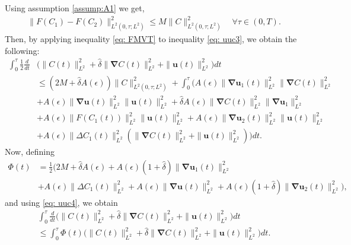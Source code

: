 \documentclass[final,3p,times]{elsarticle}
\theoremstyle{plain}
\theoremstyle{remark}
\theoremstyle{plain}
\theoremstyle{remark}
\begin{document}
Using assumption \eqref{assump:A1} we get,
\begin{align}
   \|F\left(C_1\right)-F\left(C_2\right)\|^2_{L^2\left(0,\tau;L^2\right)}\le M \|C\|^2_{L^2\left(0,\tau;L^2\right)} \quad \forall \tau \in \left(0,T\right). \label{eq: FMVT}
\end{align}
Then, by applying inequality \eqref{eq: FMVT} to inequality \eqref{eq: uuc3}, we obtain the following:
\begin{align}
\int_0^\tau \frac{1}{2} \frac{d}{dt} & \Big(\|C\left(t\right)\|^2_{L^2} + \hat \delta\|\boldsymbol{\nabla} C\left(t\right)\|^2_{L^2} +\|\mathbf u\left(t\right)\|_{L^2}^2 \Big) dt \nonumber \\ 
& \le  \left(2M+\hat \delta A\left(\epsilon\right) \right)\|C\|^2_{L^2\left(0,\tau;L^2\right)} + \int_0^\tau\Big(A\left(\epsilon\right) \|\boldsymbol{\nabla}\mathbf u_1\left(t\right)\|^2_{L^2} \|\boldsymbol{\nabla} C\left(t\right)\|^2_{L^2} \nonumber \\
& + A\left(\epsilon\right) \|\boldsymbol{\nabla}\mathbf u\left(t\right)\|^2_{L^2} \|\mathbf u\left(t\right)\|^2_{L^2} +\hat \delta  A\left(\epsilon\right) \|\boldsymbol{\nabla} C\left(t\right)\|^{2}_{L^2} \|\boldsymbol{\nabla} \mathbf u_1\|^{2}_{L^2} \nonumber \\
& + A\left(\epsilon\right)\|F\left(C_1\left(t\right)\right)\|^2_{L^2}\|\mathbf u\left(t\right)\|_{L^2}^2 + A\left(\epsilon\right)\|\boldsymbol{\nabla}\mathbf u_2\left(t\right)\|^2_{L^2}\|\mathbf u\left(t\right)\|^2_{L^2} \nonumber \\ 
& + A\left(\epsilon\right) \|\Delta C_1\left(t\right)\|_{L^2}^2 \left( \|\boldsymbol{\nabla} C\left(t\right)\|_{L^2}^2 + \|\mathbf{u}\left(t\right)\|_{L^2}^2 \right)\Big)dt. \label{eq: uuc4} 
\end{align}
Now, defining
\begin{align}
    \Phi\left(t\right) & = \frac{1}{2}\Big(2M+\hat \delta A\left(\epsilon\right)+A\left(\epsilon\right)\left(1+\hat \delta\right) \|\boldsymbol{\nabla}\mathbf u_1\left(t\right)\|^2_{L^2} \nonumber\\ 
    & + A\left(\epsilon\right) \|\Delta C_1\left(t\right)\|_{L^2}^2+A\left(\epsilon\right) \|\boldsymbol{\nabla}\mathbf u\left(t\right)\|^2_{L^2} + A\left(\epsilon\right)\left(1+\hat \delta\right) \|\boldsymbol{\nabla}\mathbf u_2\left(t\right)\|^2_{L^2}\Big),
\end{align}
and using \eqref{eq: uuc4}, we obtain
\begin{align}
    \int_0^\tau \frac{d}{dt} 
       \Big(\|C\left(t\right)\|^2_{L^2} + \hat \delta\|\boldsymbol{\nabla} C\left(t\right)\|^2_{L^2} +\|\mathbf u\left(t\right)\|_{L^2}^2  \Big) dt
   \nonumber\\ \le \int_0^\tau \Phi\left(t\right)\Big(\|C\left(t\right)\|^2_{L^2} + \hat \delta\|\boldsymbol{\nabla} C\left(t\right)\|^2_{L^2} +\|\mathbf u\left(t\right)\|_{L^2}^2  \Big) dt. \label{eq: uniqueness u+C}
\end{align}
\end{document}
